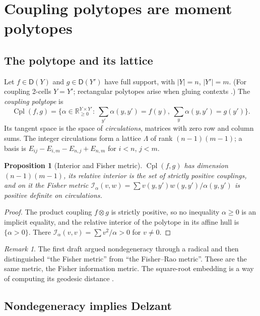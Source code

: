 \documentclass[11pt]{article}
\newtheorem{proposition}[theorem]{Proposition}
\theoremstyle{definition}
\theoremstyle{remark}
\newtheorem{remark}[theorem]{Remark}
\newcommand{\D}{\mathsf{D}}
\newcommand{\Cpl}{\operatorname{Cpl}}
\begin{document}
\section{Coupling polytopes are moment polytopes}\label{sec:toric}

\subsection{The polytope and its lattice}

Let $f\in\D(Y)$ and $g\in\D(Y')$ have full support, with $\lvert Y\rvert=n$, $\lvert Y'\rvert=m$. (For
coupling 2-cells $Y=Y'$; rectangular polytopes arise when gluing contexts
\cite[Prop.~7.11]{Awasthi-Attribution}.) The \emph{coupling polytope} is
\[
\Cpl(f,g)=\Big\{\alpha\in\mathbb{R}_{\ge0}^{Y\times Y'}:\ \textstyle\sum_{y'}\alpha(y,y')=f(y),\
\sum_y\alpha(y,y')=g(y')\Big\}.
\]
Its tangent space is the space of \emph{circulations}, matrices with zero row and column sums. The
integer circulations form a lattice $\Lambda$ of rank $(n-1)(m-1)$; a basis is
$E_{ij}-E_{i,m}-E_{n,j}+E_{n,m}$ for $i<n$, $j<m$.

\begin{proposition}[Interior and Fisher metric]\label{prop:interior}
$\Cpl(f,g)$ has dimension $(n-1)(m-1)$, its relative interior is the set of strictly positive
couplings, and on it the Fisher metric $\mathcal{I}_\alpha(v,w)=\sum v(y,y')w(y,y')/\alpha(y,y')$ is
positive definite on circulations.
\end{proposition}
\begin{proof}
The product coupling $f\otimes g$ is strictly positive, so no inequality $\alpha\ge0$ is an implicit
equality, and the relative interior of the polytope in its affine hull is $\{\alpha>0\}$. There
$\mathcal{I}_\alpha(v,v)=\sum v^2/\alpha>0$ for $v\ne0$.
\end{proof}

\begin{remark}
The first draft argued nondegeneracy through a radical and then distinguished ``the Fisher metric''
from ``the Fisher--Rao metric''. These are the same metric, the Fisher information metric. The
square-root embedding is a way of computing its geodesic distance \cite[Prop.~8.1]{Awasthi-Attribution}.
\end{remark}

\subsection{Nondegeneracy implies Delzant}
\end{document}
